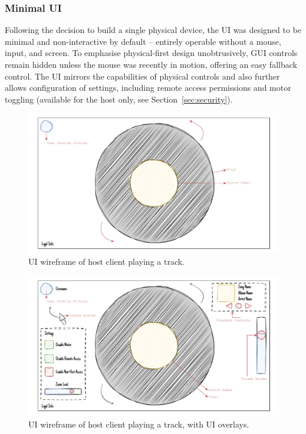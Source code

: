             \subsubsection{Minimal UI}
    
            Following the decision to build a single physical device, the UI was designed to be minimal and non-interactive by default -- entirely operable without a mouse, input, and screen. To emphasise physical-first design unobtrusively, GUI controls remain hidden unless the mouse was recently in motion, offering an easy fallback control. The UI mirrors the capabilities of physical controls and also further allows configuration of settings, including remote access permissions and motor toggling (available for the host only, see Section~\ref{sec:security}).
     
            \begin{figure}[h]
                \centering
                \includegraphics[width=0.85\linewidth]{images/SketchHostMin.pdf}
                \caption{UI wireframe of host client playing a track.}
                \label{fig:sketchHostQuiet}
            \end{figure}
            
            \begin{figure}[h]
                \centering
                \includegraphics[width=0.85\linewidth]{images/SketchHostMax.pdf}
                \caption{UI wireframe of host client playing a track, with UI overlays.}
                \label{fig:sketchHostGui}
            \end{figure}
    
